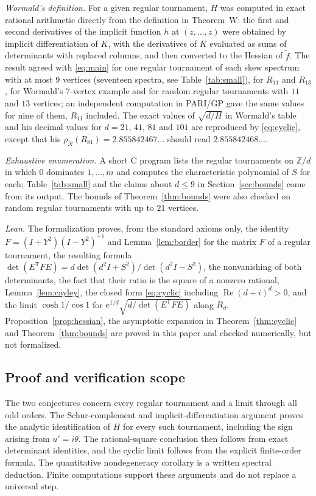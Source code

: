 \documentclass[11pt]{amsart}
\theoremstyle{remark}
\numberwithin{equation}{section}
\newcommand{\T}{\mathsf{T}}
\newcommand{\cR}{\mathcal{R}}
\begin{document}
\emph{Wormald's definition.} For a given regular tournament, $H$ was computed in exact rational arithmetic directly from the definition in Theorem~W: the first and second derivatives of the implicit function $h$ at $(z,\dots,z)$ were obtained by implicit differentiation of $K$, with the derivatives of $K$ evaluated as sums of determinants with replaced columns, and then converted to the Hessian of $\tilde f$. The result agreed with \eqref{eq:main} for one regular tournament of each skew spectrum with at most $9$ vertices (seventeen spectra, see Table~\ref{tab:small}), for $R_{11}$ and $R_{13}$, for Wormald's $7$-vertex example and for random regular tournaments with $11$ and $13$ vertices; an independent computation in PARI/GP gave the same values for nine of them, $R_{11}$ included. The exact values of $\sqrt{d/H}$ in Wormald's table and his decimal values for $d=21$, $41$, $81$ and $101$ are reproduced by \eqref{eq:cyclic}, except that his $\rho_\cR(R_{81})=2.855842467\ldots$ should read $2.855842468\ldots$.

\emph{Exhaustive enumeration.} A short C program lists the regular tournaments on $\mathbb Z/d$ in which $0$ dominates $1,\dots,m$ and computes the characteristic polynomial of $S$ for each; Table~\ref{tab:small} and the claims about $d\le9$ in Section~\ref{sec:bounds} come from its output. The bounds of Theorem~\ref{thm:bounds} were also checked on random regular tournaments with up to $21$ vertices.

\emph{Lean.} The formalization proves, from the standard axioms only, the identity $F=(I+Y^2)(I-Y^2)^{-1}$ and Lemma~\ref{lem:border} for the matrix $F$ of a regular tournament, the resulting formula $\det(E^\T FE)=d\det(d^2I+S^2)/\det(d^2I-S^2)$, the nonvanishing of both determinants, the fact that their ratio is the square of a nonzero rational, Lemma~\ref{lem:cayley}, the closed form \eqref{eq:cyclic} including $\operatorname{Re}(d+i)^d>0$, and the limit $\cosh1/\cos1$ for $e^{1/d}\sqrt{d/\det(E^\T FE)}$ along $R_d$. Proposition~\ref{prop:hessian}, the asymptotic expansion in Theorem~\ref{thm:cyclic} and Theorem~\ref{thm:bounds} are proved in this paper and checked numerically, but not formalized.

\subsection*{Proof and verification scope}
The two conjectures concern every regular tournament and a limit through all odd orders. The Schur-complement and implicit-differentiation argument proves the analytic identification of $H$ for every such tournament, including the sign arising from $u'=i\theta$. The rational-square conclusion then follows from exact determinant identities, and the cyclic limit follows from the explicit finite-order formula. The quantitative nondegeneracy corollary is a written spectral deduction. Finite computations support these arguments and do not replace a universal step.
\end{document}
